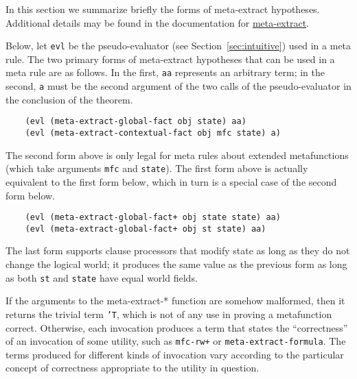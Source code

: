 In this section we summarize briefly the forms of meta-extract
hypotheses.  Additional details may be found in the documentation for
\href{http://www.cs.utexas.edu/users/moore/acl2/manuals/current/manual/index.html?topic=ACL2\_\_\_\_META-EXTRACT}{\underline{meta-extract}}.

Below, let {\tt evl} be the pseudo-evaluator (see
Section~\ref{sec:intuitive}) used in a meta rule.  The two primary
forms of meta-extract hypotheses that can be used in a meta rule are
as follows.  In the first, {\tt aa} represents an arbitrary term; in
the second, {\tt a} must be the second argument of the two calls of
the pseudo-evaluator in the conclusion of the theorem.

\begin{verbatim}
    (evl (meta-extract-global-fact obj state) aa)
    (evl (meta-extract-contextual-fact obj mfc state) a)
\end{verbatim}

The second form above is only legal for meta rules about extended
metafunctions (which take arguments {\tt mfc} and {\tt state}).  The
first form above is actually equivalent to the first form below, which
in turn is a special case of the second form below.

\begin{verbatim}
    (evl (meta-extract-global-fact+ obj state state) aa)
    (evl (meta-extract-global-fact+ obj st state) aa)
\end{verbatim}

The last form supports clause processors that modify state as long as
they do not change the logical world; it produces the same value as
the previous form as long as both {\tt st} and {\tt state} have equal
world fields.

If the arguments to the meta-extract-* function are somehow malformed,
then it returns the trivial term {\tt 'T}, which is not of any use in
proving a metafunction correct.  Otherwise, each invocation produces a
term that states the ``correctness'' of an invocation of some
utility, such as {\tt mfc-rw+} or {\tt meta-\allowbreak{}extract-\allowbreak{}formula}.  The
terms produced for different kinds of invocation vary according to the
particular concept of correctness appropriate to the utility in
question.


